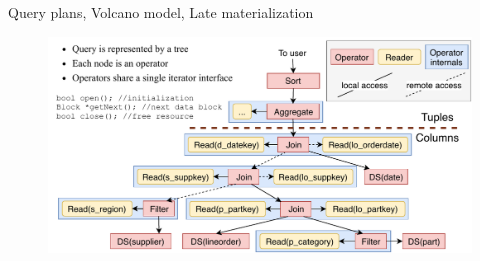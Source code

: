 \documentclass[compress, dvipsnames, unicode]{beamer}
\begin{document}
\begin{frame}{Query plans, Volcano model, Late materialization}
\begin{figure}
\includegraphics[width=\textwidth,height=\textheight,keepaspectratio]{images/volcano_query.pdf}
\end{figure}
\end{frame}
\end{document}
